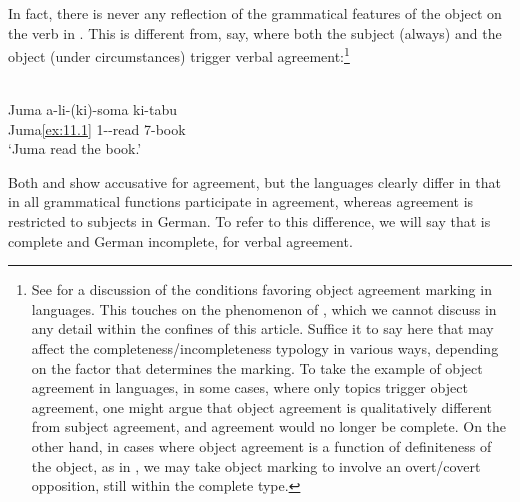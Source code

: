 \documentclass[output=paper]{langsci/langscibook}
\begin{document}
In fact, there is never any reflection of the grammatical features of the
object on the verb in . This is different from, say, 
where both the subject (always) and the object (under circumstances) trigger
verbal agreement:\footnote{See \citet[235--236]{Creissels2000} for a discussion
    of the conditions favoring object agreement
    marking in  languages. This touches on the phenomenon of
    , which we cannot discuss in any detail
    within the confines of this article. Suffice it to say here that
     may affect the
    completeness/incompleteness typology in various ways, depending on the
    factor that determines the marking. To take the example of object
    agreement in  languages, in some
    cases, where only topics trigger object
    agreement, one
    might argue that object agreement is
    qualitatively different from subject agreement, and agreement would no longer be complete. On the other hand, in
    cases where object agreement is a function
    of definiteness of the object, as in , we may take object
marking to involve an overt/covert opposition, still within the complete
type.}\newpage

\ea%
    \label{ex:11.5} \parencite[18]{Barrett-Keach1980}\\
    \gll Juma    a-li-(ki)-soma  ki-tabu\\
        Juma\eqref{ex:11.1}  1--read    7-book\\
    \glt ‘Juma read the book.’
\z

Both  and  show accusative  for
agreement, but the languages clearly differ in that in  all
grammatical functions participate in agreement, whereas agreement is restricted
to subjects in German. To refer to this difference, we will say that
 is complete and German incomplete, for verbal agreement.
\end{document}

